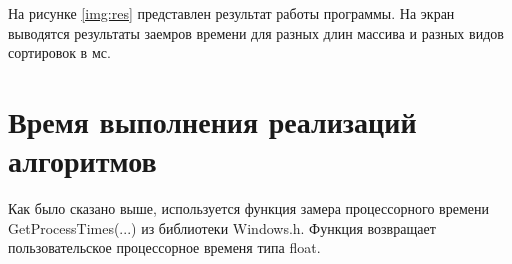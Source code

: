 На рисунке \ref{img:res} представлен результат работы программы. На экран выводятся результаты заемров времени для разных длин массива и разных видов сортировок в мс.
\newpage
%
\begin{center}
	\label{img:res}
\end{center}
\newpage
\section{Время выполнения реализаций алгоритмов}

Как было сказано выше, используется функция замера процессорного времени GetProcessTimes(...) из библиотеки Windows.h. Функция возвращает пользовательское процессорное временя типа float.

